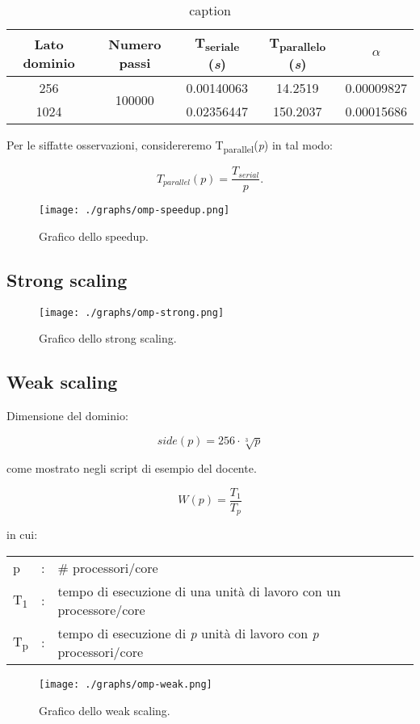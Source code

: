 \begin{table}[ht]
\begin{tabular}{ccccc}
\toprule
 Lato dominio & Numero passi & T\textsubscript{seriale} (\textit{s}) &
 T\textsubscript{parallelo} (\textit{s})& $\alpha$ \\
 \midrule
    256 & \multirow{2}{*}{100000} & 0.00140063 & 14.2519 & 0.00009827 \\
    1024 & & 0.02356447 & 150.2037 & 0.00015686 \\
\bottomrule
\end{tabular}
\caption{caption}
\end{table}

Per le siffatte osservazioni, considereremo
T\textsubscript{parallel}(\textit{p}) in tal modo:

\[
T_{parallel}(p) = \frac{T_{serial}}{p}.
\]

\begin{figure}[!ht]
  \centering
  \texttt{[image: ./graphs/omp-speedup.png]}
  \caption{Grafico dello speedup.}\label{fig:speedup1}
\end{figure}

\newpage

\subsection{Strong scaling}

\begin{figure}[!ht]
  \centering
  \texttt{[image: ./graphs/omp-strong.png]}
  \caption{Grafico dello strong scaling.}\label{fig:strong1}
\end{figure}

\subsection{Weak scaling}

Dimensione del dominio:

\[
side(p) = 256 \cdot \sqrt[3]{p}
\]

come mostrato negli script di esempio del docente.

\[
W(p) = \frac{T_{1}}{T_{p}}
\]

in cui:
\begin{table}[ht]
\begin{tabular}{lll}
    p &: & \# processori/core\\
    T\textsubscript{1}&: & tempo di esecuzione di una unità di lavoro con un
    processore/core\\
    T\textsubscript{p}&: & tempo di esecuzione di \textit{p} unità di lavoro con
    \textit{p} processori/core
\end{tabular}
\end{table}

\begin{figure}[!ht]
  \centering
  \texttt{[image: ./graphs/omp-weak.png]}
  \caption{Grafico dello weak scaling.}\label{fig:weak1}
\end{figure}
